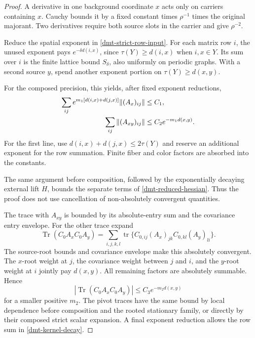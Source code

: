 \begin{proof}
A derivative in one background coordinate \(x\) acts only
on carriers containing \(x\). Cauchy bounds it by a fixed
constant times \(\rho^{-1}\) times the original majorant.
Two derivatives require both source slots in the carrier
and give \(\rho^{-2}\).

Reduce the spatial exponent in
\eqref{dmt-strict-row-input}. For each matrix row \(i\),
the unused exponent pays \(e^{-\delta d(i,x)}\), since
\(\tau(Y)\ge d(i,x)\) when \(i,x\in Y\). Its sum over
\(i\) is the finite lattice bound \(S_\delta\), also
uniformly on periodic graphs. With a second source \(y\),
spend another exponent portion on
\(\tau(Y)\ge d(x,y)\).

For the composed precision, this yields, after fixed
exponent reductions,
\begin{align}
 \sum_{ij}e^{m_1[d(i,x)+d(j,x)]}
                   \|(A_x)_{ij}\|&\le C_1,\notag\\
 \sum_{ij}\|(A_{xy})_{ij}\|
                   &\le C_2e^{-m_1d(x,y)}.
 \label{dmt-entry-source-bounds}
\end{align}
For the first line, use
\(d(i,x)+d(j,x)\le2\tau(Y)\) and reserve an additional
exponent for the row summation. Finite fiber and color
factors are absorbed into the constants.

The same argument before composition, followed by the
exponentially decaying external lift \(H\), bounds the
separate terms of \eqref{dmt-reduced-hessian}. Thus the
proof does not use cancellation of non-absolutely
convergent quantities.

The trace with \(A_{xy}\) is bounded by its absolute-entry
sum and the covariance entry envelope. For the other
trace expand
\begin{equation}
 \operatorname{Tr}(C_0A_xC_0A_y)
 =\sum_{i,j,k,l}\operatorname{tr}
     \{C_{0,ij}(A_x)_{jk}C_{0,kl}(A_y)_{li}\}.
 \label{dmt-trace-expansion}
\end{equation}
The source-root bounds and covariance envelope make this
absolutely convergent. The \(x\)-root weight at \(j\),
the covariance weight between \(j\) and \(i\), and the
\(y\)-root weight at \(i\) jointly pay \(d(x,y)\).
All remaining factors are absolutely summable. Hence
\[
 |\operatorname{Tr}(C_0A_xC_0A_y)|
                         \le C_3e^{-m_2d(x,y)}
\]
for a smaller positive \(m_2\). The pivot traces have the
same bound by local dependence before composition and the
rooted stationary family, or directly by their composed
strict scalar expansion. A final exponent reduction
allows the row sum in \eqref{dmt-kernel-decay}.
\end{proof}


